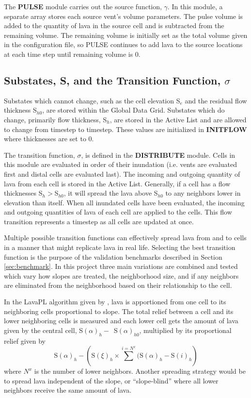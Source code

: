 \documentclass[12pt,letter]{article}
\begin{document}
		The \textbf{PULSE} module carries out the source function, $\gamma$. In this module, a separate array stores each source vent's volume parameters. The pulse volume is added to the quantity of lava in the source cell and is subtracted from the remaining volume. The remaining volume is initially set as the total volume given in the configuration file, so PULSE continues to add lava to the source locations at each time step until remaining volume is 0.
		
	\subsection[Substates and the Transition Function]{Substates, S, and the Transition Function, $\sigma$}
		Substates which cannot change, such as the cell elevation S$_e$ and the residual flow thickness S$_{h0}$, are stored within the Global Data Grid. Substates which do change, primarily flow thickness, S$_h$, are stored in the Active List and are allowed to change from timestep to timestep. These values are initialized in \textbf{INITFLOW} where thicknesses are set to 0.
		
		The transition function, $\sigma$, is defined in the \textbf{DISTRIBUTE} module. Cells in this module are evaluated in order of their inundation (i.e. vents are evaluated first and distal cells are evaluated last). The incoming and outgoing quantity of lava from each cell is stored in the Active List. Generally, if a cell has a flow thicknesses S$_h>$S$_{h0}$, it will spread the lava above S$_{h0}$ to any neighbors lower in elevation than itself. When all inundated cells have been evaluated, the incoming and outgoing quantities of lava of each cell are applied to the cells. This flow transition represents a timestep as all cells are updated at once.
		
		Multiple possible transition functions can effectively spread lava from and to cells in a manner that might replicate lava in real life. Selecting the best transition function is the purpose of the validation benchmarks described in Section \ref{sec:benchmark}. In this project three main variations are combined and tested which vary how slopes are treated, the neighborhood size, and if any neighbors are eliminated from the neighborhood based on their relationship to the cell.
			
		In the LavaPL algorithm given by \citet{connor2012}, lava is apportioned from one cell to its neighboring cells proportional to slope. The total relief between a cell and its lower neighboring cells is measured and each lower cell gets the amount of lava given by the central cell, S$(\alpha)_h-$~S$(\alpha)_{h0}$, multiplied by its proportional relief given by 
		\begin{equation}
			\mathrm{S}(\alpha)_h-\left(\mathrm{S}(\xi)_h\times\sum^{i=N^x}(\mathrm{S}(\alpha)_h-\mathrm{S}(i)_h\right)
		\end{equation}
		where $N^x$ is the number of lower neighbors. Another spreading strategy would be to spread lava independent of the slope, or ``slope-blind'' where all lower neighbors receive the same amount of lava.
		
\end{document}
